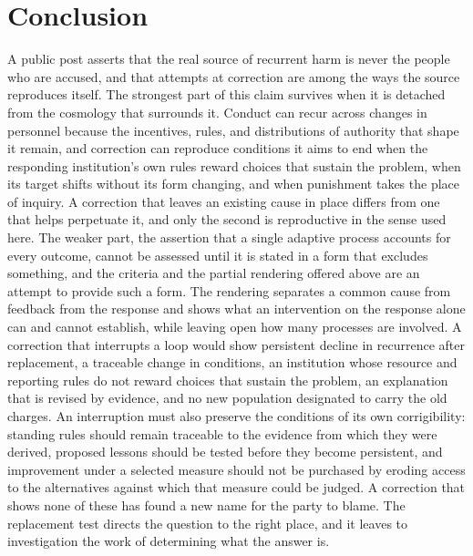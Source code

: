 \documentclass[11pt]{article}
\theoremstyle{definition}
\begin{document}
\section{Conclusion}

A public post asserts that the real source of recurrent harm is never the people who are accused, and that attempts at correction are among the ways the source reproduces itself. The strongest part of this claim survives when it is detached from the cosmology that surrounds it. Conduct can recur across changes in personnel because the incentives, rules, and distributions of authority that shape it remain, and correction can reproduce conditions it aims to end when the responding institution's own rules reward choices that sustain the problem, when its target shifts without its form changing, and when punishment takes the place of inquiry. A correction that leaves an existing cause in place differs from one that helps perpetuate it, and only the second is reproductive in the sense used here. The weaker part, the assertion that a single adaptive process accounts for every outcome, cannot be assessed until it is stated in a form that excludes something, and the criteria and the partial rendering offered above are an attempt to provide such a form. The rendering separates a common cause from feedback from the response and shows what an intervention on the response alone can and cannot establish, while leaving open how many processes are involved. A correction that interrupts a loop would show persistent decline in recurrence after replacement, a traceable change in conditions, an institution whose resource and reporting rules do not reward choices that sustain the problem, an explanation that is revised by evidence, and no new population designated to carry the old charges. An interruption must also preserve the conditions of its own corrigibility: standing rules should remain traceable to the evidence from which they were derived, proposed lessons should be tested before they become persistent, and improvement under a selected measure should not be purchased by eroding access to the alternatives against which that measure could be judged. A correction that shows none of these has found a new name for the party to blame. The replacement test directs the question to the right place, and it leaves to investigation the work of determining what the answer is.
\end{document}
